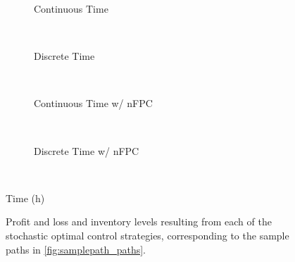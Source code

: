 \begin{figure}%
\centering%
\setlength{}%
\setlength{}%
\begin{subfigure}[b]{\linewidth}%
  \centering%
  \hspace{1.5cm}%
  \caption{Continuous Time}%
\end{subfigure}\\%
\vspace{1cm}%
\begin{subfigure}[b]{\linewidth}%
  \centering
  \hspace{1.5cm}%
  \caption{Discrete Time}%
\end{subfigure}\\%
\vspace{1cm}%
\begin{subfigure}[b]{\linewidth}%
  \centering%
  \hspace{1.5cm}%
  \caption{Continuous Time w/ nFPC}%
\end{subfigure}\\%
\vspace{1cm}%
\begin{subfigure}[b]{\linewidth}%
  \centering%
  \hspace{1.5cm}%
  \caption{Discrete Time w/ nFPC}%
\end{subfigure}\\%
\leavevmode{}\hspace{0pt plus 1filll}\null%

Time (h)

\vspace{1cm}%
  \caption[Comparison of P\&L and inventory on the sample path]{Profit and loss and inventory levels resulting from each of the stochastic optimal control strategies, corresponding to the sample paths in \autoref{fig:samplepath_paths}.}\label{fig:samplepath_pnl_inv}%
\end{figure}

